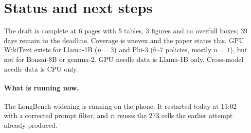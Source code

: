 \documentclass[11pt]{article}
\begin{document}
\section{Status and next steps}
The draft is complete at 6 pages with 5 tables, 3 figures and no overfull boxes; 39 days
remain to the deadline. Coverage is uneven and the paper states this. GPU WikiText exists for Llama-1B ($n{=}3$)
and Phi-3 (6--7 policies, mostly $n{=}1$), but not for Bonsai-8B or gemma-2. GPU needle data is
Llama-1B only. Cross-model needle data is CPU only.

\paragraph{What is running now.} The LongBench widening is running on the phone. It
restarted today at 13:02 with a corrected prompt filter, and it reuses the 273 cells the
earlier attempt already produced.
\end{document}
